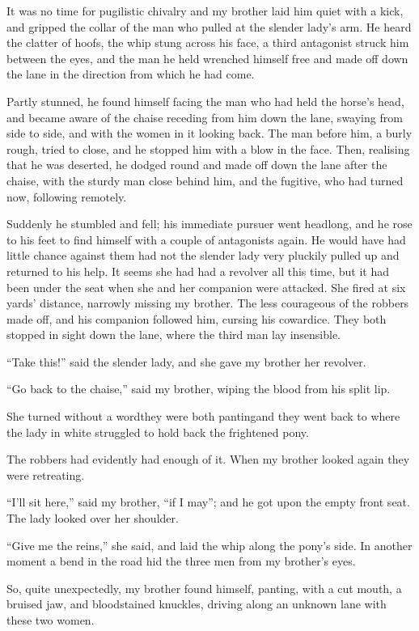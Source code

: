 It was no time for pugilistic chivalry and my brother laid him
quiet with a kick, and gripped the collar of the man who pulled at
the slender lady's arm. He heard the clatter of hoofs, the whip
stung across his face, a third antagonist struck him between the
eyes, and the man he held wrenched himself free and made off down
the lane in the direction from which he had come.

Partly stunned, he found himself facing the man who had held the
horse's head, and became aware of the chaise receding from him down
the lane, swaying from side to side, and with the women in it
looking back. The man before him, a burly rough, tried to close,
and he stopped him with a blow in the face. Then, realising that he
was deserted, he dodged round and made off down the lane after the
chaise, with the sturdy man close behind him, and the fugitive, who
had turned now, following remotely.

Suddenly he stumbled and fell; his immediate pursuer went headlong,
and he rose to his feet to find himself with a couple of
antagonists again. He would have had little chance against them had
not the slender lady very pluckily pulled up and returned to his
help. It seems she had had a revolver all this time, but it had
been under the seat when she and her companion were attacked. She
fired at six yards' distance, narrowly missing my brother. The less
courageous of the robbers made off, and his companion followed him,
cursing his cowardice. They both stopped in sight down the lane,
where the third man lay insensible.

``Take this!'' said the slender lady, and she gave my brother her
revolver.

``Go back to the chaise,'' said my brother, wiping the blood from his
split lip.

She turned without a word\dash{}they were both panting\dash{}and they went
back to where the lady in white struggled to hold back the
frightened pony.

The robbers had evidently had enough of it. When my brother looked
again they were retreating.

``I'll sit here,'' said my brother, ``if I may''; and he got upon the
empty front seat. The lady looked over her shoulder.

``Give me the reins,'' she said, and laid the whip along the pony's
side. In another moment a bend in the road hid the three men from
my brother's eyes.

So, quite unexpectedly, my brother found himself, panting, with a
cut mouth, a bruised jaw, and bloodstained knuckles, driving along
an unknown lane with these two women.

